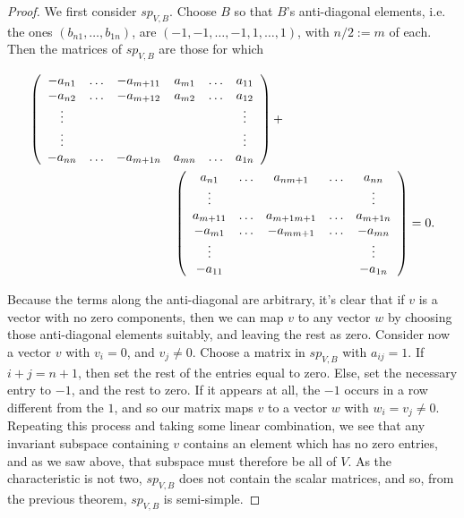 \documentclass{amsart}
\begin{document}
\begin{proof}


We first consider $sp_{V,B}$.  Choose $B$ so that $B$'s anti-diagonal
elements, i.e. the ones $(b_{n1}, \ldots, b_{1 n})$, are $(-1, -1,
\ldots, -1,1,\ldots, 1)$, with $n/2 := m$ of each.  Then the matrices of
$sp_{V,B}$ are those for which 

\begin{align*}
\left( \begin{array}{cccccc}
-a_{n1} & \ldots & -a_{m+1 1} & a_{m 1} & \ldots & a_{11} \\ 
-a_{n2} & \ldots & -a_{m+1 2} & a_{m 2} & \ldots & a_{12} \\
\vdots & & & & & \vdots\\ 
\vdots & & & & & \vdots\\ 
-a_{nn} & \ldots & -a_{m+1 n} & a_{m n} & \ldots & a_{1n} \\
\end{array}\right) + \hspace{10 em} & \\
\left( \begin{array}{ccccc}
a_{n1} & \ldots & a_{n m+1} & \ldots & a_{nn} \\
\vdots & & & & \vdots \\ 
a_{m+1 1} & \ldots & a_{m+1 m+1} & \ldots & a_{m+1 n} \\
-a_{m 1} & \ldots & -a_{m m+1} & \ldots &-a_{m n} \\
\vdots & & & & \vdots\\  
-a_{11} & & & & -a_{1n} \\
\end{array}\right) 
& = 0.
\end{align*}

\noindent
Because the terms along the anti-diagonal are arbitrary, it's clear
that if $v$ is a vector with no zero components, then we can map $v$
to any vector $w$ by choosing those anti-diagonal elements suitably,
and leaving the rest as zero.  Consider now a vector $v$ with $v_{i} =
0$, and $v_{j} \neq 0$.  Choose a matrix in $sp_{V,B}$ with $a_{ij} =
1$.  If $i+j = n+1$, then set the rest of the entries equal to zero.
Else, set the necessary entry to $-1$, and the rest to zero.  If it
appears at all, the $-1$ occurs in a row different from the $1$, and
so our matrix maps $v$ to a vector $w$ with $w_{i} = v_{j} \neq 0$.
Repeating this process and taking some linear combination, 
we see that any invariant subspace containing
$v$ contains an element which has no zero entries, and as we saw
above, that subspace must therefore be all of $V$.  As the
characteristic is not two, $sp_{V,B}$ does not contain the scalar
matrices, and so, from the previous theorem, $sp_{V,B}$ is semi-simple.


\end{proof}
\end{document}
